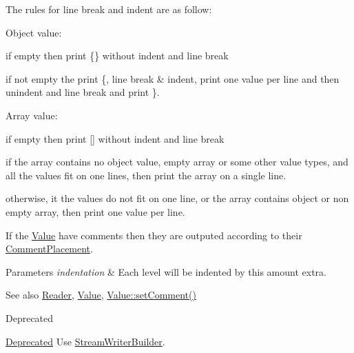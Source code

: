 The rules for line break and indent are as follow\+:
\begin{DoxyItemize}
\item Object value\+:
\begin{DoxyItemize}
\item if empty then print \{\} without indent and line break
\item if not empty the print \textquotesingle{}\{\textquotesingle{}, line break \& indent, print one value per line and then unindent and line break and print \textquotesingle{}\}\textquotesingle{}.
\end{DoxyItemize}
\item Array value\+:
\begin{DoxyItemize}
\item if empty then print \mbox{[}\mbox{]} without indent and line break
\item if the array contains no object value, empty array or some other value types, and all the values fit on one lines, then print the array on a single line.
\item otherwise, it the values do not fit on one line, or the array contains object or non empty array, then print one value per line.
\end{DoxyItemize}
\end{DoxyItemize}

If the \hyperlink{class_json_1_1_value}{Value} have comments then they are outputed according to their \hyperlink{namespace_json_a4fc417c23905b2ae9e2c47d197a45351}{Comment\+Placement}.


\begin{DoxyParams}{Parameters}
{\em indentation} & Each level will be indented by this amount extra. \\
\hline
\end{DoxyParams}
\begin{DoxySeeAlso}{See also}
\hyperlink{class_json_1_1_reader}{Reader}, \hyperlink{class_json_1_1_value}{Value}, \hyperlink{class_json_1_1_value_a29f3a30f7e5d3af6f38d57999bf5b480}{Value\+::set\+Comment()} 
\end{DoxySeeAlso}
\begin{DoxyRefDesc}{Deprecated}
\item[\hyperlink{deprecated__deprecated000010}{Deprecated}]Use \hyperlink{class_json_1_1_stream_writer_builder}{Stream\+Writer\+Builder}. \end{DoxyRefDesc}



